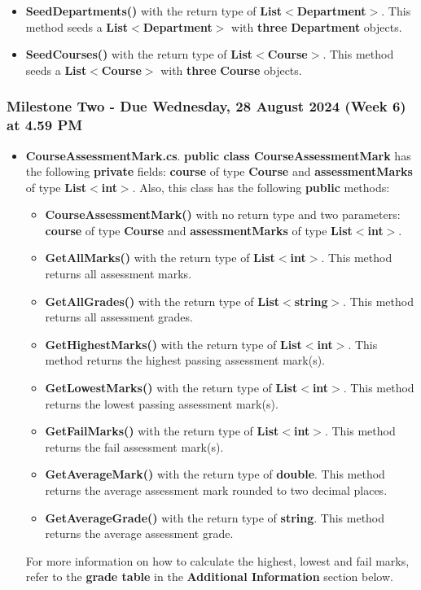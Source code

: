 \documentclass{article}
\begin{document}
\begin{itemize}
\begin{itemize}
        \item \textbf{SeedDepartments()} with the return type of \textbf{List$<$Department$>$}. This method seeds a \textbf{List$<$Department$>$} with \textbf{three} \textbf{Department} objects.
        \item \textbf{SeedCourses()} with the return type of \textbf{List$<$Course$>$}. This method seeds a \textbf{List$<$Course$>$} with \textbf{three} \textbf{Course} objects.
    \end{itemize}
\end{itemize}

\subsubsection*{Milestone Two - Due Wednesday, 28 August 2024 (Week 6) at 4.59 PM}

\begin{itemize}
    \item \textbf{CourseAssessmentMark.cs}. \textbf{public class CourseAssessmentMark} has the following \textbf{private} fields: \textbf{course} of type \textbf{Course} and \textbf{assessmentMarks} of type \textbf{List$<$int$>$}. Also, this class has the following \textbf{public} methods:
    \begin{itemize}
        \item \textbf{CourseAssessmentMark()} with no return type and two parameters: \textbf{course} of type \textbf{Course} and \textbf{assessmentMarks} of type \textbf{List$<$int$>$}. 
        \item \textbf{GetAllMarks()} with the return type of \textbf{List$<$int$>$}. This method returns all assessment marks.
        \item \textbf{GetAllGrades()} with the return type of \textbf{List$<$string$>$}. This method returns all assessment grades.
        \item \textbf{GetHighestMarks()} with the return type of \textbf{List$<$int$>$}. This method returns the highest passing assessment mark(s).
        \item \textbf{GetLowestMarks()} with the return type of \textbf{List$<$int$>$}. This method returns the lowest passing assessment mark(s). 
        \item \textbf{GetFailMarks()} with the return type of \textbf{List$<$int$>$}. This method returns the fail assessment mark(s).
        \item \textbf{GetAverageMark()} with the return type of \textbf{double}. This method returns the average assessment mark rounded to two decimal places.
        \item \textbf{GetAverageGrade()} with the return type of \textbf{string}. This method returns the average assessment grade.
    \end{itemize}
    For more information on how to calculate the highest, lowest and fail marks, refer to the \textbf{grade table} in the \textbf{Additional Information} section below.
\end{itemize}
\end{document}

